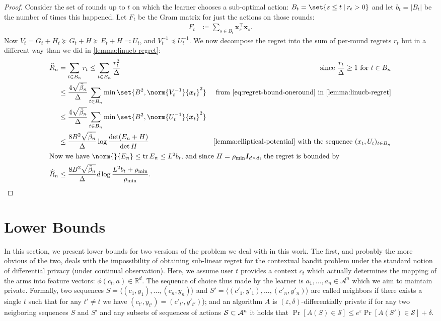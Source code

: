 \documentclass{article}
\renewcommand{\vec}[1]{\bm{#1}}
\newcommand{\defeq}{\coloneq}
\newcommand{\eqdef}{\eqcolon}
\newcommand{\inv}[1]{#1^{-1}}
\newcommand{\Real}{\mathds{R}}
\DeclareMathOperator{\tr}{tr}
\newcommand\given[1][\delimsize]{%
  \providecommand{\delimsize}{}
  \nonscript\:#1\vert\allowbreak\nonscript\:\mathopen{}
}
\providecommand\transp{\top}
\let\transpsymbol\transp
\renewcommand{\transp}[1]{#1^\transpsymbol}
\newcommand{\Aset}[1]{\mathcal{A}_{#1}}
\newcommand{\Eye}[1]{\bm{I}_{#1 \times #1}}
\newcommand{\XtX}[1]{\transp{#1}{#1}}
\begin{document}
\begin{proof}
  Consider the set of rounds up to $t$ on which the learner chooses a
  sub-optimal action: $B_t = \set{s \le t \given r_t > 0}$ and let
  $b_t = |B_t|$ be the number of times this happened.  Let $F_t$ be
  the Gram matrix for just the actions on those rounds:
  \begin{align*}
    F_t &\defeq \sum_{s\in B_t} \XtX{\vec x_s}.
  \end{align*}
  Now $V_t = G_t + H_t \succeq G_t + H \succeq E_t + H \eqdef U_t$, and
  $\inv{V_t} \preceq \inv{U_t}$.  We now decompose the regret into the
  sum of per-round regrets $r_t$ but in a different way than we did in
  \cref{lemma:linucb-regret}:
  \begin{align*}
    \widehat R_n
    &= \sum_{t\in B_n} r_t \le \sum_{t\in B_n} \frac{r_t^2}{\Delta}
    &\text{since } \frac{r_t}{\Delta} \ge 1 \text{ for } t\in B_n \\
    &\le \frac{4\sqrt{\bar\beta_n}}{\Delta} \sum_{t\in B_n} \min\set{B^2, \norm{\inv{V_t}}{\vec x_t}^2}
    &\text{from \eqref{eq:regret-bound-oneround} in \cref{lemma:linucb-regret}} \\
    &\le \frac{4\sqrt{\bar\beta_n}}{\Delta} \sum_{t\in B_n} \min\set{B^2, \norm{\inv{U_t}}{\vec x_t}^2} \\
    &\le \frac{8B^2\sqrt{\bar\beta_n}}{\Delta} \log\frac{\det(E_n+H)}{\det H}
    &\text{\Cref{lemma:elliptical-potential} with the sequence } (x_t, U_t)_{t\in B_n} \\
    \intertext{Now we have $\norm{}{E_n} \le \tr E_n \le L^2b_t$, and since $H =
    \rho_{\min}\Eye{d}$, the regret is bounded by}
    \widehat R_n &\le \frac{8B^2\sqrt{\bar\beta_n}}{\Delta} d\log\frac{L^2b_t + \rho_{\min}}{\rho_{\min}}.
  \end{align*}

\end{proof}


\section{Lower Bounds}
\label{sec:lower_bounds}

In this section, we present lower bounds for two versions of the problem we deal with in this work. The first, and probably the more obvious of the two, deals with the impossibility of obtaining sub-linear regret for the contextual bandit problem under the standard notion of differential privacy (under continual observation). Here, we assume user $t$ provides a context $c_t$ which actually determines the mapping of the arms into feature vectors: $\phi(c_t, a) \in \Real^d$. The sequence of choice thus made by the learner is $a_1,..., a_n \in \Aset{}^n$ which we aim to maintain private. Formally, two sequences $S = \langle (c_1, y_1),..., (c_n,y_n)\rangle$ and $S' = \langle (c'_1, y'_1),..., (c'_n,y'_n)\rangle$ are called neighbors if there exists a single $t$ such that for any $t'\neq t$ we have $(c_{t'},y_{t'}) = (c'_{t'},y'_{t'})$); and an algorithm $A$ is $(\varepsilon,\delta)$-differentially private if for any two neigboring sequences $S$ and $S'$ and any subsets of sequences of actions ${\cal S}\subset \Aset{}^n$ it holds that $\Pr[A(S)\in\mathcal{S}] \leq e^\varepsilon \Pr[A(S')\in \mathcal{S}] +\delta$.
\end{document}
